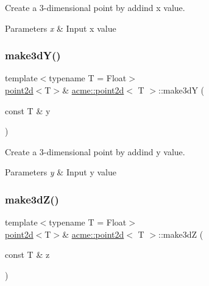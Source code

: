 Create a 3-\/dimensional point by addind x value. 


\begin{DoxyParams}{Parameters}
{\em x} & Input x value \\
\hline
\end{DoxyParams}
\mbox{\label{classacme_1_1point2d_ac6bdbcec56da64ea0265691f3e734625}} 
\subsubsection{\texorpdfstring{make3d\+Y()}{make3dY()}}
{\footnotesize\ttfamily template$<$typename T = Float$>$ \\
\hyperlink{classacme_1_1point2d}{point2d}$<$T$>$\& \hyperlink{classacme_1_1point2d}{acme\+::point2d}$<$ T $>$\+::make3dY (\begin{DoxyParamCaption}\item[{const T \&}]{y }\end{DoxyParamCaption})\hspace{0.3cm}{\ttfamily [inline]}}



Create a 3-\/dimensional point by addind y value. 


\begin{DoxyParams}{Parameters}
{\em y} & Input y value \\
\hline
\end{DoxyParams}
\mbox{\label{classacme_1_1point2d_a605f4d335747c08026316ec4982b7eb5}} 
\subsubsection{\texorpdfstring{make3d\+Z()}{make3dZ()}}
{\footnotesize\ttfamily template$<$typename T = Float$>$ \\
\hyperlink{classacme_1_1point2d}{point2d}$<$T$>$\& \hyperlink{classacme_1_1point2d}{acme\+::point2d}$<$ T $>$\+::make3dZ (\begin{DoxyParamCaption}\item[{const T \&}]{z }\end{DoxyParamCaption})\hspace{0.3cm}{\ttfamily [inline]}}



